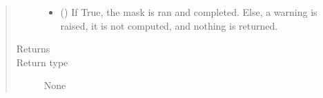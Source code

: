 \documentclass[letterpaper,10pt,english]{sphinxmanual}
\begin{document}
\begin{fulllineitems}
\begin{quote}
\begin{description}
\begin{itemize}
\item {} 
 (\sphinxstyleliteralemphasis{\sphinxupquote{ (}}\sphinxstyleliteralemphasis{\sphinxupquote{)}}) \textendash{} If True, the mask is ran and completed. Else, a warning is
raised, it is not computed, and nothing is returned.

\end{itemize}

\item[{Returns}] \leavevmode


\item[{Return type}] \leavevmode
None

\end{description}\end{quote}

\end{fulllineitems}

\end{document}
